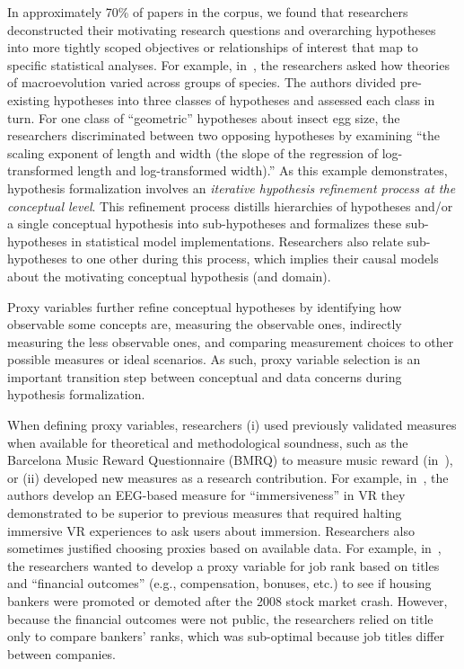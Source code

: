 
In approximately 70\% of papers in the corpus, we found that researchers
deconstructed their motivating research questions and overarching hypotheses into
more tightly scoped objectives or relationships of interest that map to
specific statistical analyses. For example, in~\cite{N8}, the researchers asked how theories of macroevolution
varied across groups of species. The authors divided pre-existing hypotheses
into three classes of hypotheses and assessed each class in turn. For one class
of ``geometric'' hypotheses about insect egg size, the researchers
discriminated between two opposing hypotheses by examining ``the scaling
exponent of length and width (the slope of the regression of log-transformed
length and log-transformed width).'' As this example demonstrates, hypothesis
formalization involves an \emph{iterative hypothesis refinement process at the
conceptual level}. This refinement process distills hierarchies of hypotheses
and/or a single conceptual hypothesis into sub-hypotheses and formalizes these
sub-hypotheses in statistical model implementations. Researchers also relate sub-hypotheses to one other during this process, which implies their causal models about the motivating conceptual hypothesis (and domain).

Proxy variables further refine conceptual hypotheses by identifying how observable some
concepts are, measuring the observable ones, indirectly measuring the less
observable ones, and comparing measurement choices to other possible measures or
ideal scenarios. As such, proxy variable selection is an important
transition step between conceptual and data concerns during hypothesis
formalization.

When defining proxy variables, researchers (i) used previously validated
measures when available for theoretical and methodological soundness, such as
the Barcelona Music Reward Questionnaire (BMRQ) to measure music reward
(in~\cite{PS1}), or (ii) developed new measures as a research contribution. For
example, in~\cite{CHI0}, the authors develop an EEG-based measure for
``immersiveness'' in VR they demonstrated to be superior to previous measures
that required halting immersive VR experiences to ask users about immersion.
Researchers also sometimes justified choosing proxies based on available data.
For example, in~\cite{JFE5}, the researchers wanted to develop a proxy variable
for job rank based on titles and ``financial outcomes'' (e.g., compensation,
bonuses, etc.) to see if housing bankers were promoted or demoted after the 2008 stock market
crash. However, because the financial outcomes were not public, the researchers
relied on title only to compare bankers' ranks, which was sub-optimal because
job titles differ between companies. 


